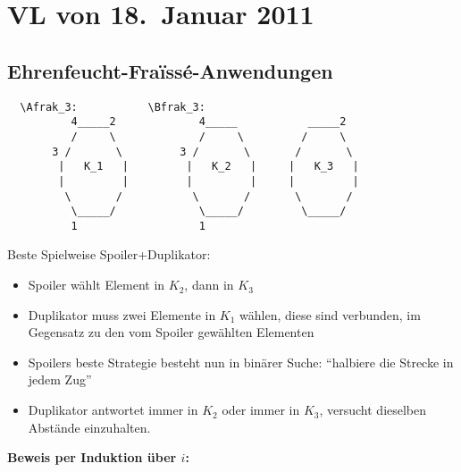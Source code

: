 \section{VL von 18.~Januar 2011}

\subsection{Ehrenfeucht-Fraïssé-Anwendungen}

\begin{verbatim}
  \Afrak_3:           \Bfrak_3:
          4_____2             4_____           _____2
          /     \             /     \         /     \
       3 /       \         3 /       \       /       \
        |   K_1   |         |   K_2   |     |   K_3   |
        |         |         |         |     |         |
         \       /           \       /       \       /
          \_____/             \_____/         \_____/
          1                   1
\end{verbatim}

Beste Spielweise Spoiler+Duplikator:

\begin{itemize}
  \item Spoiler wählt Element in $K_2$, dann in $K_3$
  \item Duplikator muss zwei Elemente in $K_1$ wählen, diese sind
  verbunden, im Gegensatz zu den vom Spoiler gewählten Elementen
  \item Spoilers beste Strategie besteht nun in binärer Suche:
  \enquote{halbiere die Strecke in jedem Zug}
  \item Duplikator antwortet immer in $K_2$ oder immer in $K_3$,
  versucht dieselben Abstände einzuhalten.
\end{itemize}

\textbf{Beweis per Induktion über $i$:}

